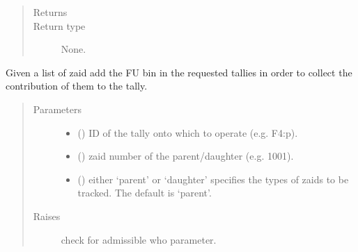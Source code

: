 \documentclass[letterpaper,10pt,english]{sphinxmanual}
\begin{document}
\begin{fulllineitems}
\begin{fulllineitems}
\begin{quote}
\begin{description}
\item[{Returns}] \leavevmode


\item[{Return type}] \leavevmode
None.

\end{description}\end{quote}

\end{fulllineitems}


\begin{fulllineitems}
\label{\detokenize{api/inputgeneration:inputfile.D1S_Input.add_track_contribution}}
Given a list of zaid add the FU bin in the requested tallies in order
to collect the contribution of them to the tally.
\begin{quote}\begin{description}
\item[{Parameters}] \leavevmode\begin{itemize}
\item {} 
 () \textendash{} ID of the tally onto which to operate (e.g. F4:p).

\item {} 
 () \textendash{} zaid number of the parent/daughter (e.g. 1001).

\item {} 
 (\sphinxstyleliteralemphasis{\sphinxupquote{, }}) \textendash{} either ‘parent’ or ‘daughter’ specifies the types of zaids to
be tracked. The default is ‘parent’.

\end{itemize}

\item[{Raises}] \leavevmode
{} \textendash{} check for admissible who parameter.


\end{description}
\end{quote}
\end{fulllineitems}
\end{fulllineitems}
\end{document}
